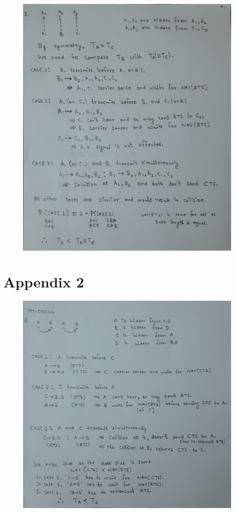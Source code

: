 \documentclass[11pt, fleqn]{article}
\begin{document}
\begin{figure}[H]
    \centering
    \includegraphics[scale=0.3]{Appendix_1.jpg}
\end{figure}

\newpage
\section*{Appendix 2}
\label{Appendix 2}

\begin{figure}[H]
    \centering
    \includegraphics[scale=0.3]{Appendix_2.jpg}
\end{figure}
\end{document}

